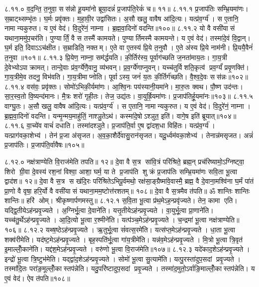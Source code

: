 ८.११.०
व॒द॒न्ति॒ त॒नुवा॒ सस॑न्नो हू॒यमा॑नो ब्रूया॒दन्नं॑ प्र॒जाप॑ति॒रेकं॑ च॥ ११॥
८.११.१
प्र॒जाप॑तिः सम्भ्रि॒यमा॑णः। स॒म्राट्थ्सम्भृ॑तः। घ॒र्मः प्रवृ॑क्तः। म॒हा॒वी॒र उद्वा॑सितः। अ॒सौ खलु॒ वावैष आ॑दि॒त्यः। यत्प्र॑व॒र्ग्य॑। स ए॒तानि॒ नामान्यकुरुत। य ए॒वं वेद॑। वि॒दुरे॑नं॒ नाम्ना। ब्र॒ह्म॒वा॒दिनो॑ वदन्ति॥१००॥
८.११.२
यो वै वसी॑यासं यथाना॒ममु॑प॒चर॑ति। पुण्यार्तिं॒ वै स तस्मै॑ कामयते। पुण्यार्तिमस्मै कामयन्ते। य ए॒वं वेद॑। तस्मा॑दे॒वं  वि॒द्वान्। घ॒र्म इति॒ दिवाऽऽच॑क्षीत। स॒म्राडिति॒ नक्तम्। ए॒ते वा ए॒तस्य॑ प्रि॒ये त॒नुवौ। ए॒ते अ॑स्य प्रि॒ये नाम॑नी। प्रि॒ययै॒वैनं॑ त॒नुवा॥१०१॥
८.११.३
प्रि॒येण॒ नाम्ना॒ सम॑र्द्धयति। की॒र्तिर॑स्य॒ पूर्वाग॑च्छति ज॒नता॑माय॒तः। गा॒य॒त्री दे॒वेभ्योऽपाक्रामत्। तान्दे॒वाः प्र॑व॒र्ग्ये॑णै॒वानु॒ व्य॑भवन्। प्र॒व॒र्ग्ये॑णाप्नुवन्। यच्च॑तुर्विशति॒कृत्व॑ प्रव॒र्ग्यं॑ प्रवृ॒णक्ति॑। गा॒य॒त्रीमे॒व तदनु॒ विभ॑वति। गा॒य॒त्रीमाप्नोति। पूर्वाऽस्य॒ जनं॑ य॒तः की॒र्तिर्ग॑च्छति। वै॒श्व॒दे॒वः सस॑न्नः॥१०२॥
८.११.४
वस॑वः॒ प्रवृ॑क्तः। सोमो॑ऽभिकी॒र्यमा॑णः। आ॒श्वि॒नः पय॑स्यानी॒यमा॑ने। मा॒रु॒तः क्वथ\sn{}। पौ॒ष्ण उद॑न्तः। सा॒र॒स्व॒तो वि॒ष्यन्द॑मानः। मै॒त्रः  शरो॑ गृही॒तः। तेज॒ उद्य॑तः। वा॒युर्ह्रि॒यमा॑णः। प्र॒जाप॑तिर्\mbox{}हू॒यमा॑नः॥१०३॥
८.११.५
वाग्घु॒तः। अ॒सौ खलु॒ वावैष आ॑दि॒त्यः। यत्प्र॑व॒र्ग्य॑। स ए॒तानि॒ नामान्यकुरुत। य ए॒वं वेद॑। वि॒दुरे॑नं॒ नाम्ना। ब्र॒ह्म॒वा॒दिनो॑ वदन्ति। यन्मृ॒न्मय॒माहु॑तिं॒ नाश्ञु॒तेऽथ॑। कस्मा॑दे॒षोऽश्ञुत॒ इति॑। वागे॒ष इति॑ ब्रूयात्॥१०४॥
८.११.६
वा॒च्ये॑व वाचं॑ दधाति। तस्मा॑दश्ञुते। प्र॒जाप॑ति॒र्वा ए॒ष द्वा॑दश॒धा विहि॑तः। यत्प्र॑व॒र्ग्य॑। यत्प्राग॑वका॒शेभ्य॑। तेन॑ प्र॒जा अ॑सृजत। अ॒व॒का॒शैर्दे॑वासु॒रान॑सृजत। यदू॒र्ध्वम॑वका॒शेभ्य॑। तेनान्न॑मसृजत। अन्नं॑ प्र॒जाप॑तिः। प्र॒जाप॑ति॒र्वावैषः॥१०५॥
\anuvakamend

८.१२.०
नक्ष॑त्राण्येति वि॒राज॑मेति तपति॥ १२॥ दे॒वा वै स॒त्र सा॑वि॒त्रं परि॑श्रिते॒ ब्रह्म॒न् प्रच॑रिष्यामो॒ऽग्निष्ट्वा॒ शिरो ग्री॒वा दे॒वस्य॑ रश॒नां  विश्वा॒ आशा॒ घर्म॒ या ते प्र॒जाप॑ति शुक्रं प्र॒जाप॑तिः सम्भ्रि॒यमा॑णः सवि॒ता भू॒त्वा द्वाद॑श॥ १२॥ दे॒वा वै स॒त्र स ख॑दि॒रः परि॑श्रितेऽभिपू॒र्वमथो॒ रक्ष॑सा॒ङ्ग्रैष्मा॑वे॒वास्मै॒ ब्रह्म॒ वै दे॒वाना॒मश्वि॑ना घ॒र्मं पा॑तं प्रा॒णो वै वृषा॒ हरि॒र्यो वै वसी॑यासं यथाना॒मम॒ष्टोत्त॑रशतम्॥ १०८॥ दे॒वा वै स॒त्रमैव त॑पति॥ ॐ शान्तिः  शान्तिः  शान्तिः॥ हरि॑ ओम्। श्रीकृष्णार्पणमस्तु॥
८.१२.१
स॒वि॒ता भू॒त्वा प्र॑थ॒मेऽह॒न्प्रवृ॑ज्यते। तेन॒ कामा एति। यद्द्वि॒तीयेऽह॑न्प्रवृ॒ज्यते। अ॒ग्निर्भू॒त्वा दे॒वाने॑ति। यत्तृ॒तीयेऽह॑न्प्रवृ॒ज्यते। वा॒युर्भू॒त्वा प्रा॒णाने॑ति। यच्च॑तु॒र्थेऽह॑न्प्रवृ॒ज्यते। आ॒दि॒त्यो भू॒त्वा र॒श्मीने॑ति। यत्प॑ञ्च॒मेऽह॑न्प्रवृ॒ज्यते। च॒न्द्रमा॑ भू॒त्वा नक्ष॑त्राण्येति॥१०६॥
८.१२.२
यथ्ष॒ष्ठेऽह॑न्प्रवृ॒ज्यते। ऋ॒तुर्भू॒त्वा सं॑वत्स॒रमे॑ति। यत्स॑प्त॒मेऽह॑न्प्रवृ॒ज्यते। धा॒ता भू॒त्वा शक्व॑रीमेति। यद॑ष्ट॒मेऽह॑न्प्रवृ॒ज्यते। बृह॒स्पति॑र्भू॒त्वा गा॑य॒त्रीमे॑ति। यन्न॑व॒मेऽह॑न्प्रवृ॒ज्यते। मि॒त्रो भू॒त्वा त्रि॒वृत॑ इ॒माल्लोँ॒काने॑ति। यद्द॑श॒मेऽह॑न्प्रवृ॒ज्यते। वरु॑णो भू॒त्वा वि॒राज॑मेति॥१०७॥
८.१२.३
यदे॑काद॒शेऽह॑न्प्रवृ॒ज्यते। इन्द्रो॑ भू॒त्वा त्रि॒ष्टुभ॑मेति। यद्द्वा॑द॒शेऽह॑न्प्रवृ॒ज्यते। सोमो॑ भू॒त्वा सु॒त्यामे॑ति। यत्पु॒रस्ता॑दुप॒सदां प्रवृ॒ज्यते। तस्मा॑दि॒तः परा॑ङ॒मूल्लोँ॒कास्तप॑न्नेति। यदु॒परि॑ष्टादुप॒सदां प्रवृ॒ज्यते। तस्मा॑द॒मुतो॒ऽर्वाङि॒माल्लोँ॒कास्तप॑न्नेति। य ए॒वं वेद॑। ऐव त॑पति॥१०८॥


